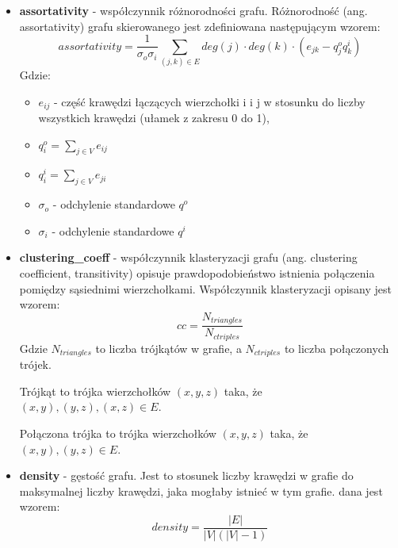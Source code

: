 \begin{itemize}
      \item \textbf{assortativity} - współczynnik różnorodności grafu.  Różnorodność (ang. assortativity) grafu skierowanego jest zdefiniowana następującym wzorem:
            \begin{equation}
                  \label{eq:assortativity}
                  assortativity = \frac{1}{\sigma_o \sigma_i} \sum_{(j,k)\in{E}} deg(j) \cdot deg(k) \cdot (e_{jk} - q_j^o q_k^i)
            \end{equation}
            Gdzie:
            \begin{itemize}
                  \item $e_{ij}$ - część krawędzi łączących wierzchołki i i j w stosunku do liczby wszystkich krawędzi (ułamek z zakresu 0 do 1),
                  \item $q_i^o = \sum_{j \in V} e_{ij}$
                  \item $q_i^i = \sum_{j \in V} e_{ji}$
                  \item $\sigma_o$ - odchylenie standardowe $q^o$
                  \item $\sigma_i$ - odchylenie standardowe $q^i$
            \end{itemize}
      \item \textbf{clustering\_coeff} - współczynnik klasteryzacji grafu (ang. clustering coefficient, transitivity) opisuje prawdopodobieństwo istnienia połączenia pomiędzy sąsiednimi wierzchołkami.
            Współczynnik klasteryzacji opisany jest wzorem:
            $$cc = \frac{N_{triangles}}{N_{ctriples}}$$
            Gdzie $N_{triangles}$ to liczba trójkątów w grafie, a $N_{ctriples}$ to liczba połączonych trójek.

            Trójkąt to trójka wierzchołków $(x,y,z)$ taka, że $(x,y), (y,z), (x,z) \in E$.

            Połączona trójka to trójka wierzchołków $(x,y,z)$ taka, że $(x,y), (y,z) \in E$.

      \item \textbf{density} - gęstość grafu. Jest to stosunek liczby krawędzi w grafie do maksymalnej liczby krawędzi, jaka mogłaby istnieć w tym grafie.
            dana jest wzorem:
            $$density = \frac{|E|}{|V|(|V|-1)}$$


\end{itemize}
